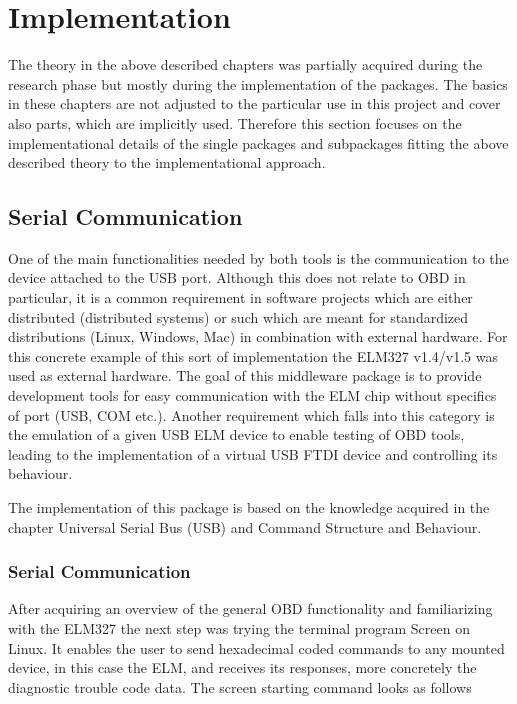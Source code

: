 
\chapter{Implementation}

The theory in the above described chapters was partially acquired during the research phase but mostly during the implementation of the packages. 
The basics in these chapters are not adjusted to the particular use in this project and cover also parts, which are implicitly used. 
Therefore this section focuses on the implementational details of the single packages and subpackages fitting the above described theory to the 
implementational approach.

\section{Serial Communication}

One of the main functionalities needed by both tools is the communication to the device attached to the USB port. Although this does not relate 
to OBD in particular, it is a common requirement in software projects which are either distributed (distributed systems) or  such which are 
meant for standardized distributions (Linux, Windows, Mac) in combination with external hardware. For this concrete example of this sort of 
implementation the ELM327 v1.4/v1.5 was used as external hardware. The goal of this middleware package is to provide development tools for easy 
communication with the ELM chip without specifics of port (USB, COM etc.). Another requirement which falls into this category is the emulation 
of a given USB ELM device to enable testing of OBD tools, leading to the implementation of a virtual USB FTDI device and controlling its behaviour.

The implementation of this package is based on the knowledge acquired in the chapter Universal Serial Bus (USB) and Command Structure and Behaviour.

\subsection{Serial Communication}

After acquiring an overview of the general OBD functionality and familiarizing with the ELM327 the next step was trying the terminal program 
Screen on Linux. It enables the user to send hexadecimal coded commands to any mounted device, in this case the ELM, and receives its responses, 
more concretely the diagnostic trouble code data. The screen starting command looks as follows

